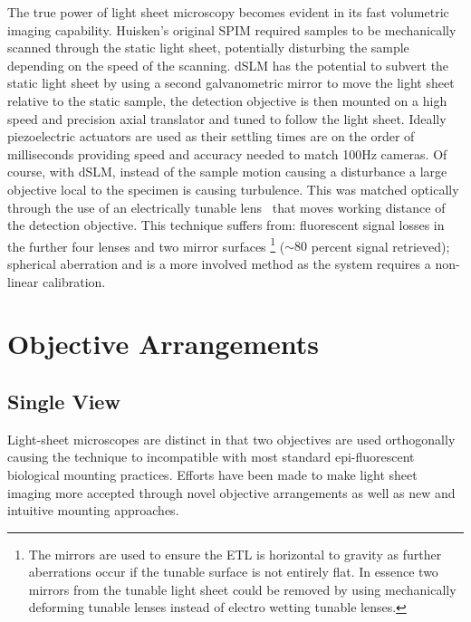 The true power of light sheet microscopy becomes evident in its fast volumetric imaging capability.
Huisken's original SPIM required samples to be mechanically scanned through the static light sheet, potentially disturbing the sample depending on the speed of the scanning.
dSLM has the potential to subvert the static light sheet by using a second galvanometric mirror to move the light sheet relative to the static sample, the detection objective is then mounted on a high speed and precision axial translator and tuned to follow the light sheet.
Ideally piezoelectric actuators are used as their settling times are on the order of milliseconds providing speed and accuracy needed to match 100Hz cameras.
Of course, with dSLM, instead of the sample motion causing a disturbance a large objective local to the specimen is causing turbulence.
This was matched optically through the use of an electrically tunable lens~\cite{fahrbach_rapid_2013-1} that moves working distance of the detection objective.
This technique suffers from: fluorescent signal losses in the further four lenses and two mirror surfaces
\footnote{The mirrors are used to ensure the ETL is horizontal to gravity as further aberrations occur if the tunable surface is not entirely flat.
In essence two mirrors from the tunable light sheet could be removed by using mechanically deforming tunable lenses instead of electro wetting tunable lenses.}
($\sim 80$ percent signal retrieved); spherical aberration and is a more involved method as the system requires a non-linear calibration.


\section{Objective Arrangements}
\subsection{Single View}
Light-sheet microscopes are distinct in that two objectives are used orthogonally causing the technique to incompatible with most standard epi-fluorescent biological mounting practices.
Efforts have been made to make light sheet imaging more accepted through novel objective arrangements as well as new and intuitive mounting approaches.

